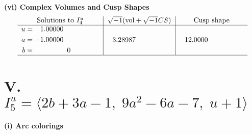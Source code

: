 \documentclass[1p]{elsarticle_modified}
\theoremstyle{definition}
\newcommand{\I}{\sqrt{-1}}
\begin{document}
\newpage\flushleft \textbf{(vi) Complex Volumes and Cusp Shapes}
$$\begin{array}{c|c|c}  
\text{Solutions to }I^u_{4}& \I (\text{vol} + \sqrt{-1}CS) & \text{Cusp shape}\\
 \hline 
\begin{aligned}
u &= \phantom{-}1.00000\phantom{ +0.000000I} \\
a &= -1.00000\phantom{ +0.000000I} \\
b &= \phantom{-0.000000 } 0\end{aligned}
 & \phantom{-}3.28987\phantom{ +0.000000I} & \phantom{-}12.0000\phantom{ +0.000000I}\\
 \hline 
 \end{array}$$\newpage\newpage\renewcommand{\arraystretch}{1}
\centering \section*{V. $I^u_{5}= \langle 2 b+3 a-1,\;9 a^2-6 a-7,\;u+1 \rangle$}
\flushleft \textbf{(i) Arc colorings}\\
\end{document}
